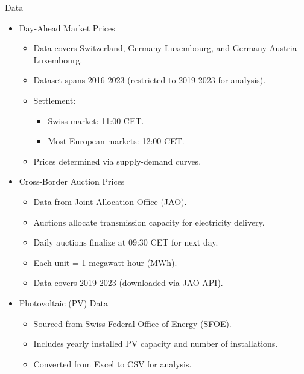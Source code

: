\documentclass[aspectratio=169,xcolor=dvipsnames]{beamer}
\begin{document}
\begin{frame}{Data}
\begin{itemize}
    \item Day-Ahead Market Prices
    \begin{itemize}
        \item Data covers Switzerland, Germany-Luxembourg, and Germany-Austria-Luxembourg.
        \item Dataset spans 2016-2023 (restricted to 2019-2023 for analysis).
        \item Settlement:
        \begin{itemize}
            \item Swiss market: 11:00 CET.
            \item Most European markets: 12:00 CET.
        \end{itemize}
        \item Prices determined via supply-demand curves.
    \end{itemize}

    \item Cross-Border Auction Prices
    \begin{itemize}
        \item Data from Joint Allocation Office (JAO).
        \item Auctions allocate transmission capacity for electricity delivery.
        \item Daily auctions finalize at 09:30 CET for next day.
        \item Each unit = 1 megawatt-hour (MWh).
        \item Data covers 2019-2023 (downloaded via JAO API).
    \end{itemize}

    \item Photovoltaic (PV) Data
    \begin{itemize}
        \item Sourced from Swiss Federal Office of Energy (SFOE).
        \item Includes yearly installed PV capacity and number of installations.
        \item Converted from Excel to CSV for analysis.
    \end{itemize}
\end{itemize}
\end{frame}
\end{document}
